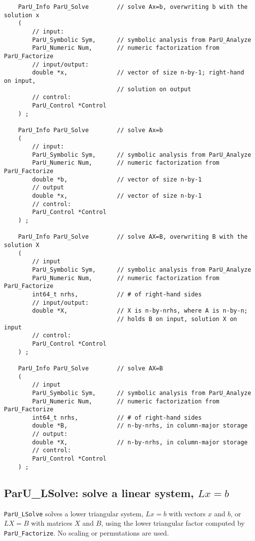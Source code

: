 \documentclass[12pt]{article}
\begin{document}
    {\footnotesize
    \begin{verbatim}
    ParU_Info ParU_Solve        // solve Ax=b, overwriting b with the solution x
    (
        // input:
        ParU_Symbolic Sym,      // symbolic analysis from ParU_Analyze
        ParU_Numeric Num,       // numeric factorization from ParU_Factorize
        // input/output:
        double *x,              // vector of size n-by-1; right-hand on input,
                                // solution on output
        // control:
        ParU_Control *Control
    ) ;

    ParU_Info ParU_Solve        // solve Ax=b
    (
        // input:
        ParU_Symbolic Sym,      // symbolic analysis from ParU_Analyze
        ParU_Numeric Num,       // numeric factorization from ParU_Factorize
        double *b,              // vector of size n-by-1
        // output
        double *x,              // vector of size n-by-1
        // control:
        ParU_Control *Control
    ) ;

    ParU_Info ParU_Solve        // solve AX=B, overwriting B with the solution X
    (
        // input
        ParU_Symbolic Sym,      // symbolic analysis from ParU_Analyze
        ParU_Numeric Num,       // numeric factorization from ParU_Factorize
        int64_t nrhs,           // # of right-hand sides
        // input/output:
        double *X,              // X is n-by-nrhs, where A is n-by-n;
                                // holds B on input, solution X on input
        // control:
        ParU_Control *Control
    ) ;

    ParU_Info ParU_Solve        // solve AX=B
    (
        // input
        ParU_Symbolic Sym,      // symbolic analysis from ParU_Analyze
        ParU_Numeric Num,       // numeric factorization from ParU_Factorize
        int64_t nrhs,           // # of right-hand sides
        double *B,              // n-by-nrhs, in column-major storage
        // output:
        double *X,              // n-by-nrhs, in column-major storage
        // control:
        ParU_Control *Control
    ) ; \end{verbatim} }

\subsection{{\sf ParU\_LSolve}: solve a linear system, $Lx=b$}

    \verb'ParU_LSolve' solves a lower triangular system, $Lx=b$ with vectors
    $x$ and $b$, or $LX=B$ with matrices $X$ and $B$, using the lower
    triangular factor computed by \verb'ParU_Factorize'.  No scaling or
    permutations are used.
\end{document}
